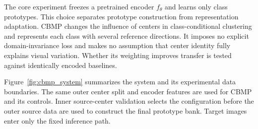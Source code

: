 The core experiment freezes a pretrained encoder $f_\theta$ and learns only class prototypes. This choice separates prototype construction from representation adaptation. CBMP changes the influence of centers in class-conditional clustering and represents each class with several reference directions. It imposes no explicit domain-invariance loss and makes no assumption that center identity fully explains visual variation. Whether its weighting improves transfer is tested against identically encoded baselines.

Figure~\ref{fig:cbmp_system} summarizes the system and its experimental data boundaries. The same outer center split and encoder features are used for CBMP and its controls. Inner source-center validation selects the configuration before the outer source data are used to construct the final prototype bank. Target images enter only the fixed inference path.

